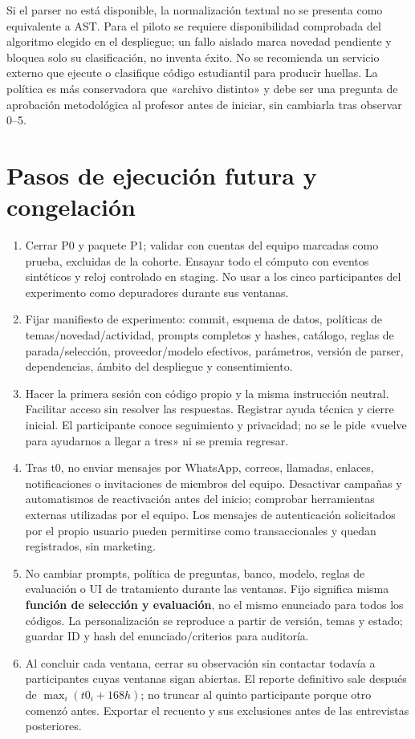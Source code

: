 \documentclass[11pt,a4paper]{report}
\begin{document}
Si el parser no está disponible, la normalización textual no se presenta como equivalente a AST. Para el piloto se requiere disponibilidad comprobada del algoritmo elegido en el despliegue; un fallo aislado marca novedad pendiente y bloquea solo su clasificación, no inventa éxito. No se recomienda un servicio externo que ejecute o clasifique código estudiantil para producir huellas. La política es más conservadora que «archivo distinto» y debe ser una pregunta de aprobación metodológica al profesor antes de iniciar, sin cambiarla tras observar 0--5.

\section{Pasos de ejecución futura y congelación}
\begin{enumerate}
\item Cerrar P0 y paquete P1; validar con cuentas del equipo marcadas como prueba, excluidas de la cohorte. Ensayar todo el cómputo con eventos sintéticos y reloj controlado en staging. No usar a los cinco participantes del experimento como depuradores durante sus ventanas.
\item Fijar manifiesto de experimento: commit, esquema de datos, políticas de temas/novedad/actividad, prompts completos y hashes, catálogo, reglas de parada/selección, proveedor/modelo efectivos, parámetros, versión de parser, dependencias, ámbito del despliegue y consentimiento.
\item Hacer la primera sesión con código propio y la misma instrucción neutral. Facilitar acceso sin resolver las respuestas. Registrar ayuda técnica y cierre inicial. El participante conoce seguimiento y privacidad; no se le pide «vuelve para ayudarnos a llegar a tres» ni se premia regresar.
\item Tras t0, no enviar mensajes por WhatsApp, correos, llamadas, enlaces, notificaciones o invitaciones de miembros del equipo. Desactivar campañas y automatismos de reactivación antes del inicio; comprobar herramientas externas utilizadas por el equipo. Los mensajes de autenticación solicitados por el propio usuario pueden permitirse como transaccionales y quedan registrados, sin marketing.
\item No cambiar prompts, política de preguntas, banco, modelo, reglas de evaluación o UI de tratamiento durante las ventanas. Fijo significa misma \textbf{función de selección y evaluación}, no el mismo enunciado para todos los códigos. La personalización se reproduce a partir de versión, temas y estado; guardar ID y hash del enunciado/criterios para auditoría.
\item Al concluir cada ventana, cerrar su observación sin contactar todavía a participantes cuyas ventanas sigan abiertas. El reporte definitivo sale después de \(\max_i(t0_i+168h)\); no truncar al quinto participante porque otro comenzó antes. Exportar el recuento y sus exclusiones antes de las entrevistas posteriores.
\end{enumerate}
\end{document}
